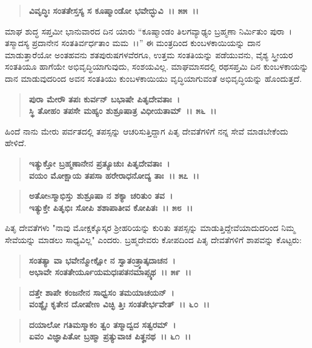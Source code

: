 \begin{verse}
\textbf{ವಿವೃದ್ಧಿಃ ಸಂತತೇಸ್ತಸ್ಯ ಸ ಕೂಷ್ಮಾಂಡೋ ಭವೇದ್ಭುವಿ~।। ೫೫~।।}
\end{verse}

ಮಾಘ ಶುದ್ಧ ಸಪ್ತಮೀ ಭಾನುವಾರದ ದಿನ ಯಾರು “ಕೂಷ್ಮಾಂಡಂ ತಿಲಗವ್ಯಾಢ್ಯಂ ಬ್ರಹ್ಮಣಾ ನಿರ್ಮಿತುಂ ಪುರಾ~। ತಸ್ಮಾದಸ್ಯ ಪ್ರದಾನೇನ ಸಂತತಿರ್ವರ್ಧತಾಂ ಮಮ~।।” ಈ ಮಂತ್ರದಿಂದ ಕುಂಬಳಕಾಯಿಯನ್ನು ದಾನ ಮಾಡುತ್ತಾರೆಯೋ ಅಂತಹವನು ಶತಪುರುಷಗಳವೆರಗೂ, ಉತ್ತಮ ಸಂತತಿಯನ್ನು ಪಡೆಯುವನು, ವೈಶ್ಯ ಸ್ತ್ರೀಯರ ಸಂತತಿಯೂ ಹಾಗೆಯೇ ಅಭಿವೃದ್ಧಿಯಾಗುವುದು, ಸಂಶಯವಿಲ್ಲ. ಮಾಘಮಾಸದಲ್ಲಿ ರಥಸಪ್ತಮಿ ದಿನ ಕುಂಬಳ\-ಕಾಯನ್ನು ದಾನ ಮಾಡುವುದರಿಂದ ಅವನ ಸಂತತಿಯು ಕುಂಬಳಕಾಯಿಯು ವೃದ್ಧಿಯಾಗುವಂತೆ ಅಭಿವೃದ್ಧಿಯನ್ನು ಹೊಂದುತ್ತದೆ.

\begin{verse}
\textbf{ಪುರಾ ಮೇರೌ ತಪಃ ಕುರ್ವನ್ ಬಭಾಷೇ ಪಿತೃದೇವತಾಃ~।}\\\textbf{ಸ್ಥಿ ತೋಹಂ ತಪಸೇ ಮಹ್ಯಂ ಶುಶ್ರೂಷಾತ್ರ ವಿಧೀಯತಾಮ್~।। ೫೬~।।}
\end{verse}

ಹಿಂದೆ ನಾನು ಮೇರು ಪರ್ವತದಲ್ಲಿ ತಪಸ್ಸನ್ನು ಆಚರಿಸುತ್ತಿದ್ದಾಗ ಪಿತೃ ದೇವತೆಗಳಿಗೆ ನನ್ನ ಸೇವೆ ಮಾಡಬೇಕೆಂದು ಹೇಳಿದೆ.

\begin{verse}
\textbf{ಇತ್ಯುಕ್ತೋ ಬ್ರಹ್ಮಣಾನೇನ ಪ್ರತ್ಯೂಚುಃ ಪಿತೃದೇವತಾಃ~।}\\\textbf{ವಯಂ ಮೋಕ್ಷಾಯ ತಪಸಾ ಹರೇರಾಧನೋದ್ಯ ತಾಃ~।। ೫೭~।।}
\end{verse}

\begin{verse}
\textbf{ಅತೋsಸ್ಮಾಭಿಸ್ತು ಶುಶ್ರೂಷಾ ನ ಶಕ್ಯಾ ಚರಿತುಂ ತವ~।}\\\textbf{ಇತ್ಯುಕ್ತೇ ಪಿತೃಭಿಃ ಸೋಪಿ ಶಶಾಪಾತೀವ ಕೋಪಿತಃ~।। ೫೮~।।}
\end{verse}

ಪಿತೃ ದೇವತೆಗಳು "ನಾವು ಮೋಕ್ಷಕ್ಕೊಸ್ಕರ ಶ‍್ರೀಹರಿಯನ್ನು ಕುರಿತು ತಪಸ್ಸನ್ನು ಮಾಡುತ್ತಿದ್ದೇವೆಯಾದುದರಿಂದ ನಿಮ್ಮ ಸೇವೆಯನ್ನು ಮಾಡಲು ಸಾಧ್ಯವಿಲ್ಲ" ಎಂದರು. ಬ್ರಹ್ಮದೇವರು ಕೋಪದಿಂದ ಪಿತೃ ದೇವತೆಗಳಿಗೆ ಶಾಪವನ್ನು ಕೊಟ್ಟರು:

\begin{verse}
\textbf{ಸಂತತ್ಯಾ ವಾ ಭವೇನ್ಮೋಕ್ಷೋ ನ ಸ್ವಾತಂತ್ರ್ಯಾತ್ಕದಾಚನ~।}\\\textbf{ಅಭಾವೇ ಸಂತತೇರ್ಯೂಯಮಧಃಪತನಮಾಪ್ಸ್ಯಥ~।। ೫೯~।। }
\end{verse}

\begin{verse}
\textbf{ದತ್ತೇ ಶಾಪೇ ಕಂಜನೇನ ಸಾಧ್ವಸಂ ತಮಯಾಚಯನ್~।}\\\textbf{ವಂಶ್ಯೈಃ ಕೃತೇನ ದೋಷೇಣ ವಿಚ್ಛಿ ತ್ತಿಃ ಸಂತತೇರ್ಭವೇತ್~।। ೬೦~।। }
\end{verse}

\begin{verse}
\textbf{ದಯಾಲೋ ಗತಿಮಸ್ಮಾಕಂ ತ್ವಂ ತಸ್ಮಾದ್ವದ ಸತ್ವರಮ್~।}\\\textbf{ಏವಂ ವಿಜ್ಞಾಪಿತೋ ಬ್ರಹ್ಮಾ ಪ್ರತ್ಯುವಾಚ ಪಿತೄನಥ~।। ೬೧~।।}
\end{verse}


